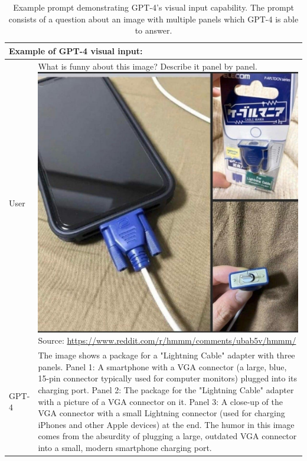 \documentclass{article}
\begin{document}
\begin{table}
\begin{tabular}[]{p{0.5in}p{4.5in}}
\toprule
\multicolumn{2}{p{5in}}{
\textbf{Example of GPT-4 visual input}:}\\
\midrule
User & What is funny about this image? Describe it panel by panel.\newline\newline
\includegraphics[width=0.8\linewidth]{assets/vga.jpg}\newline
\scriptsize{Source: \url{https://www.reddit.com/r/hmmm/comments/ubab5v/hmmm/}}\newline\newline
\\
GPT-4 & The image shows a package for a "Lightning Cable" adapter with three panels. \newline\newline
Panel 1: A smartphone with a VGA connector (a large, blue, 15-pin connector typically used for computer monitors) plugged into its charging port.\newline\newline
Panel 2: The package for the "Lightning Cable" adapter with a picture of a VGA connector on it.\newline\newline
Panel 3: A close-up of the VGA connector with a small Lightning connector (used for charging iPhones and other Apple devices) at the end.\newline\newline
The humor in this image comes from the absurdity of plugging a large, outdated VGA connector into a small, modern smartphone charging port.\\
\bottomrule
\end{tabular}
\caption{Example prompt demonstrating GPT-4's visual input capability. The prompt consists of a question about an image with multiple panels which GPT-4 is able to answer.}
\label{table:visual_input}
\end{table}
\end{document}
